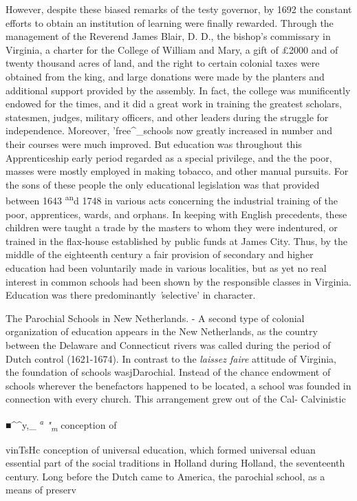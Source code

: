 \documentclass[
]{book}
\begin{document}
However, despite these biased remarks of the testy governor, by 1692 the constant efforts to obtain an institution of learning were finally rewarded. Through the management of the Reverend James Blair, D. D., the bishop's commissary in Virginia, a charter for the College of William and Mary, a gift of £2000 and of twenty thousand acres of land, and the right to certain colonial taxes were obtained from the king, and large donations were made by the planters and additional support provided by the assembly. In fact, the college was munificently endowed for the times, and it did a great work in training the greatest scholars, statesmen, judges, military officers, and other leaders during the struggle for independence. Moreover, 'free\^{}\_schools\protect\hypertarget{ch17.xmlux5cux23para.248.1.0.box.135.239.1262.955.q.60}{}{ now greatly increased in number and their courses were much improved. But education was throughout this Apprenticeship early period regarded as a special privilege, and the the poor, masses were mostly employed in making tobacco, and other manual pursuits. For the sons of these people the only educational legislation was that provided between 1643 \textsuperscript{an}d 1748 in various acts concerning the industrial training of the poor, apprentices, wards, and orphans. In keeping with English precedents, these children were taught a trade by the masters to whom they were indentured, or trained in the flax-house established by public funds at James City. Thus, by the middle of the eighteenth century a fair provision of secondary and higher education had been voluntarily made in various localities, but as yet no real interest in common schools had been shown by the responsible classes in Virginia. Education was there predominantly \emph{'}selective' in character.}

The Parochial Schools in New Netherlands. - A second type of colonial organization of education appears in the New Netherlands, as the country between the Delaware and Connecticut rivers was called during the period of Dutch control (1621-1674). In contrast to the \emph{laissez faire} attitude of Virginia, the foundation of schools wasjDarochial. Instead of the chance endowment of schools wherever the benefactors happened to be located, a school was founded in connection with every church. This arrangement grew out of the Cal- Calvinistic

■\^{}\^{}y,\_ \emph{\textsuperscript{a} "\textsubscript{m}} conception of

vinTsHc conception of universal education, which formed universal eduan essential part of the social traditions in Holland during Holland, the seventeenth century. Long before the Dutch came to America, the parochial school, as a means of preserv
\end{document}
